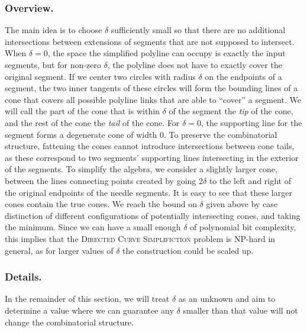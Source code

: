 \documentclass[]{llncs}
\newcommand{\rmk}[3]{\textcolor{blue}{\textsc{#1 #2:}}
\textcolor{red}{\textsf{#3}}}
\newcommand{\maarten}[2][says]{\rmk{Maarten}{#1}{#2}}
\begin{document}
\subsubsection {Overview.}

The main idea is to choose $\delta$ sufficiently small so that there are no additional intersections between extensions of segments that are not supposed to intersect. When \(\delta = 0\), the space the simplified polyline can occupy is exactly the input segments, but for non-zero \(\delta\), the polyline does not have to exactly cover the original segment. If we center two circles with radius \(\delta\) on the endpoints of a segment, the two inner tangents of these circles will form the bounding lines of a cone that covers all possible polyline links that are able to ``cover'' a segment. We will call the part of the cone that is within \(\delta\) of the segment the \emph{tip} of the cone, and the rest of the cone the \emph{tail} of the cone. For \(\delta = 0\), the supporting line for the segment forms a degenerate cone of width 0. To preserve the combinatorial structure, fattening the cones cannot introduce intersections between cone tails, as these correspond to two segments' supporting lines intersecting in the exterior of the segments.
To simplify the algebra, we consider a slightly larger cone, between the lines connecting points created by going \(2\delta\) to the left and right of the original endpoints of the needle segments. It is easy to see that these larger cones contain the true cones.
We reach the bound on $\delta$ given above by case distinction of different configurations of potentially intersecting cones, and taking the minimum.
%
Since we can have a small enough \(\delta\) of polynomial bit complexity, this implies that the \textsc{Directed Curve Simplifiction} problem is NP-hard in general, as for larger values of \(\delta\) the construction could be scaled up. 

\subsubsection {Details.}

In the remainder of this section, we will treat $\delta$ as an unknown and aim to determine a value where we can guarantee any \(\delta\) smaller than that value will not change the combinatorial structure. 
\end{document}
